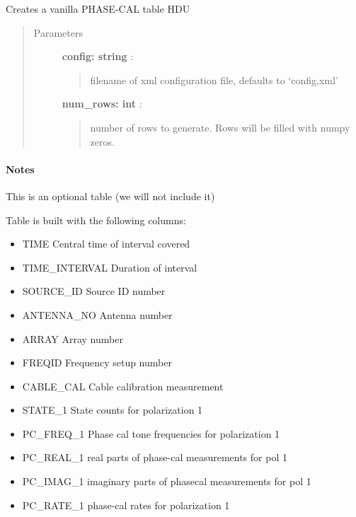 \documentclass[letterpaper,10pt,english]{sphinxmanual}
\begin{document}
\begin{fulllineitems}
\label{index:pyFitsidi.make_phase_cal}
Creates a vanilla PHASE-CAL table HDU
\begin{quote}\begin{description}
\item[{Parameters }] \leavevmode
\textbf{config: string} :
\begin{quote}

filename of xml configuration file, defaults to `config,xml'
\end{quote}

\textbf{num\_rows: int} :
\begin{quote}

number of rows to generate. Rows will be filled with numpy zeros.
\end{quote}

\end{description}\end{quote}
\paragraph{Notes}

This is an optional table (we will not include it)

Table is built with the following columns:
\begin{itemize}
\item {} 
TIME          Central time of interval covered

\item {} 
TIME\_INTERVAL Duration of interval

\item {} 
SOURCE\_ID     Source ID number

\item {} 
ANTENNA\_NO    Antenna number

\item {} 
ARRAY         Array number

\item {} 
FREQID        Frequency setup number

\item {} 
CABLE\_CAL     Cable calibration measurement

\item {} 
STATE\_1       State counts for polarization 1

\item {} 
PC\_FREQ\_1     Phase cal tone frequencies for polarization 1

\item {} 
PC\_REAL\_1     real parts of phase-cal measurements for pol 1

\item {} 
PC\_IMAG\_1     imaginary parts of phasecal measurements for pol 1

\item {} 
PC\_RATE\_1     phase-cal rates for polarization 1

\end{itemize}

\end{fulllineitems}
\end{document}
